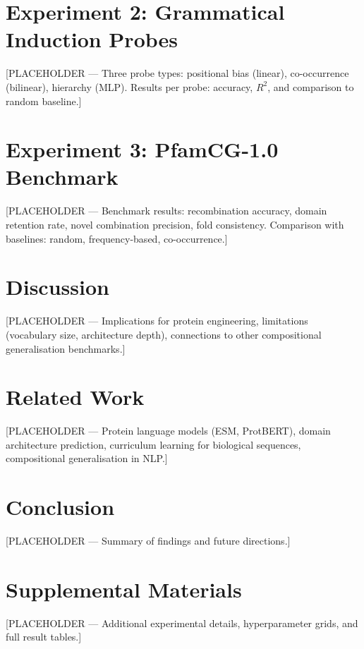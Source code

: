 \documentclass[final]{neurips_2026}
\begin{document}
\section{Experiment 2: Grammatical Induction Probes}
[PLACEHOLDER — Three probe types: positional bias (linear),
co-occurrence (bilinear), hierarchy (MLP). Results per probe:
accuracy, $R^2$, and comparison to random baseline.]

\section{Experiment 3: PfamCG-1.0 Benchmark}
[PLACEHOLDER — Benchmark results: recombination accuracy, domain
retention rate, novel combination precision, fold consistency.
Comparison with baselines: random, frequency-based, co-occurrence.]

\section{Discussion}
[PLACEHOLDER — Implications for protein engineering, limitations
(vocabulary size, architecture depth), connections to other
compositional generalisation benchmarks.]

\section{Related Work}
[PLACEHOLDER — Protein language models (ESM, ProtBERT), domain
architecture prediction, curriculum learning for biological sequences,
compositional generalisation in NLP.]

\section{Conclusion}
[PLACEHOLDER — Summary of findings and future directions.]




\appendix
\section{Supplemental Materials}
[PLACEHOLDER — Additional experimental details, hyperparameter grids,
and full result tables.]
\end{document}
